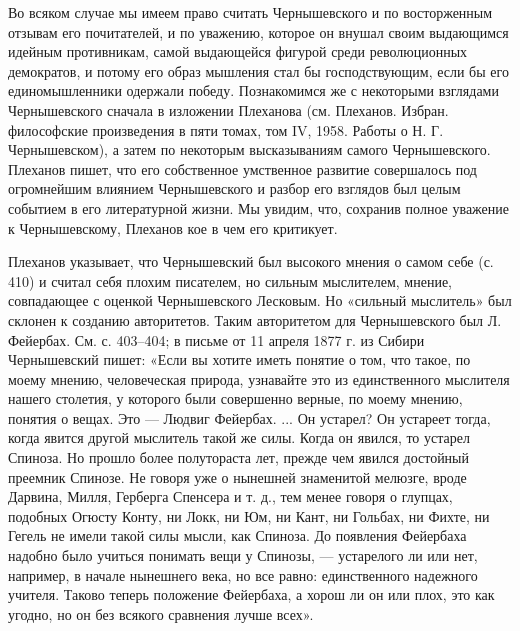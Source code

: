 Во  всяком   случае  мы  имеем   право  считать  Чернышевского   и  по
восторженным  отзывам  его  почитателей,  и по  уважению,  которое  он
внушал своим выдающимся идейным  противникам, самой выдающейся фигурой
среди  революционных  демократов, и  потому  его  образ мышления  стал
бы  господствующим,  если  бы  его  единомышленники  одержали  победу.
Познакомимся  же  с  некоторыми   взглядами  Чернышевского  сначала  в
изложении Плеханова (см. Плеханов.  Избран. философские произведения в
пяти  томах, том  IV,  1958. Работы  о Н.  Г.  Чернышевском), а  затем
по  некоторым  высказываниям  самого  Чернышевского.  Плеханов  пишет,
что его  собственное умственное  развитие совершалось  под огромнейшим
влиянием Чернышевского и разбор его  взглядов был целым событием в его
литературной  жизни.  Мы  увидим,  что,  сохранив  полное  уважение  к
Чернышевскому, Плеханов кое в чем его критикует.

Плеханов указывает, что Чернышевский был  высокого мнения о самом себе
(с.  410)  и считал  себя  плохим  писателем, но  сильным  мыслителем,
мнение,  совпадающее с  оценкой  Чернышевского  Лесковым. Но  «сильный
мыслитель» был  склонен к созданию авторитетов.  Таким авторитетом для
Чернышевского был Л. Фейербах. См. с.  403--404; в письме от 11 апреля
1877 г. из Сибири Чернышевский пишет:  «Если вы хотите иметь понятие о
том, что такое,  по моему мнению, человеческая  природа, узнавайте это
из единственного мыслителя нашего столетия, у которого были совершенно
верные, по моему мнению, понятия о вещах. Это --- Людвиг Фейербах. ...
Он устарел? Он устареет тогда,  когда явится другой мыслитель такой же
силы. Когда он явился, то устарел Спиноза. Но прошло более полутораста
лет, прежде  чем явился  достойный преемник Спинозе.  Не говоря  уже о
нынешней знаменитой мелюзге, вроде Дарвина, Милля, Герберга Спенсера и
т. д., тем менее говоря о  глупцах, подобных Огюсту Конту, ни Локк, ни
Юм,  ни Кант,  ни Гольбах,  ни Фихте,  ни Гегель  не имели  такой силы
мысли,  как  Спиноза.  До  появления Фейербаха  надобно  было  учиться
понимать вещи у Спинозы, --- устарелого ли или нет, например, в начале
нынешнего века, но все  равно: единственного надежного учителя. Таково
теперь положение Фейербаха, а хорош ли он или плох, это как угодно, но
он без всякого сравнения лучше всех».

